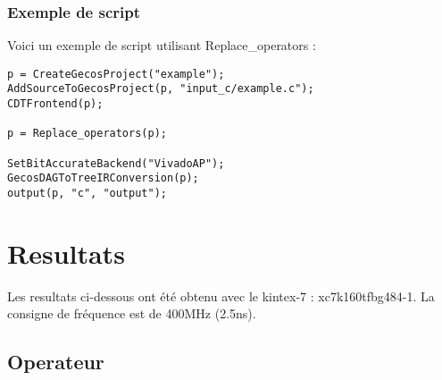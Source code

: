 \documentclass[10pt,a4paper,twoside]{article}
\begin{document}
\subsubsection{Exemple de script} 
Voici un exemple de script utilisant Replace\_operators :
\begin{verbatim}
p = CreateGecosProject("example");
AddSourceToGecosProject(p, "input_c/example.c");
CDTFrontend(p); 

p = Replace_operators(p);

SetBitAccurateBackend("VivadoAP");
GecosDAGToTreeIRConversion(p);
output(p, "c", "output");
\end{verbatim}


\section{Resultats}
Les resultats ci-dessous ont été obtenu avec le kintex-7 : xc7k160tfbg484-1. La consigne de fréquence est de 400MHz (2.5ns).
\subsection{Operateur}
\end{document}
